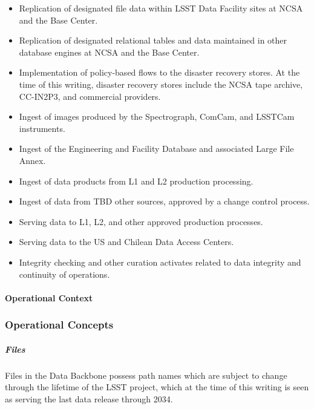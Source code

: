 \begin{itemize}

\item Replication of designated file data within LSST Data Facility sites
at NCSA and the Base Center.

\item Replication of designated relational tables and data maintained
in other database engines at NCSA and the Base Center.

\item Implementation of policy-based flows to the disaster recovery stores. At
the time of this writing, disaster recovery stores include the NCSA tape archive, CC-IN2P3,
and commercial providers.

\item Ingest of images produced by the Spectrograph, ComCam, and LSSTCam instruments.

\item Ingest of the Engineering and Facility Database and associated Large File Annex.

\item Ingest of data products from L1 and L2 production processing.

\item Ingest of data from TBD other sources, approved by a change control process.

\item Serving data to L1, L2, and other approved production processes.

\item Serving data to the US and Chilean Data Access Centers.

\item Integrity checking and other curation activates related to data integrity and
continuity of operations.

\end{itemize}

\paragraph{Operational Context}

\subsubsection{Operational Concepts}

\subparagraph{Files}

Files in the Data Backbone possess path names which are subject to change
through the lifetime of the LSST project, which at the time of this writing is
seen as serving the last data release through 2034.

